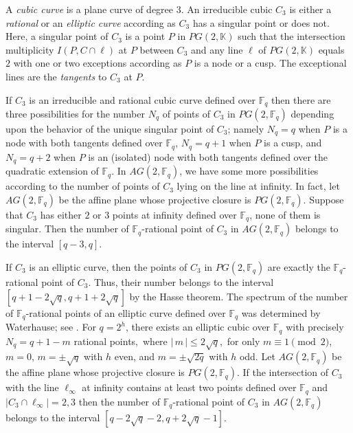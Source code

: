 \documentclass[sn-mathphys-num]{sn-jnl}%
\begin{document}
A \emph{cubic curve} is a plane curve of degree $3$.
An irreducible cubic $C_3$ is either a \emph{rational} or an \emph{elliptic curve} according as $C_3$ has a singular point or does not. Here, a singular point of $C_3$ is a point $P$ in $PG(2,\mathbb{K})$ such that the intersection multiplicity $I(P,C\cap \ell)$ at $P$ between $C_3$ and any line $\ell$ of $PG(2,\mathbb{K})$ equals $2$ with one or two exceptions according as $P$ is a node or a cusp. The exceptional lines are the \emph{tangents} to $C_3$ at $P$.

If $C_3$ is an irreducible and rational cubic curve defined over $\mathbb{F}_q$ then there are three possibilities for the number $N_q$ of points of $C_3$ in $PG(2,\mathbb{F}_q)$ depending upon the behavior of the unique singular point of $C_3$; namely $N_q=q$ when $P$ is a node with both tangents defined over $\mathbb{F}_q$, $N_q=q+1$ when $P$ is a cusp, and $N_q=q+2$ when $P$ is an (isolated) node with both tangents defined over the quadratic extension of $\mathbb{F}_q$. In $AG(2,\mathbb{F}_q)$, we have some more possibilities according to the number of points of $C_3$ lying on the line at infinity. In fact, let $AG(2,\mathbb{F}_q)$ be the affine plane whose projective closure is $PG(2,\mathbb{F}_q)$. Suppose that $C_3$ has either $2$ or $3$ points at infinity defined over $\mathbb{F}_q$, none of them is singular. Then the number of $\mathbb{F}_q$-rational point of $C_3$ in $AG(2,\mathbb{F}_q)$ belongs to the interval $[q-3,q]$.    

If $C_3$ is an elliptic curve, then the points of $C_3$ in $PG(2,\mathbb{F}_q)$ are exactly the $\mathbb{F}_q$-rational point of $C_3$. Thus, their number belongs to the interval $[q+1-2\sqrt{q},q+1+2\sqrt{q}]$ by the Hasse theorem. The spectrum of the number of $\mathbb{F}_q$-rational points of an elliptic curve defined over $\mathbb{F}_q$ was determined by Waterhause;  see \cite[Section 9.9]{HKT}. For $q=2^h$, there exists an elliptic cubic over $\mathbb{F}_q$
with precisely $N_q=q+1 -m$ rational points$,$ where $|\,m\,|\leq
2\sqrt{q},$ for only $m\equiv 1 \pmod{2}$, $m=0$, $m=\pm \sqrt{q}$ with $h$ even, and $m=\pm \sqrt{2q}$ with $h$ odd. Let $AG(2,\mathbb{F}_q)$ be the affine plane whose projective closure is $PG(2,\mathbb{F}_q)$. If the intersection of $C_3$ with the line $\ell_\infty$ at infinity contains  at least two points defined over $\mathbb{F}_q$ and $|C_3\cap \ell_\infty|=2,3$ then the number of $\mathbb{F}_q$-rational point of $C_3$ in $AG(2,\mathbb{F}_q)$ belongs to the interval $[q-2\sqrt{q}-2,q+2\sqrt{q}-1]$.    
\end{document}
